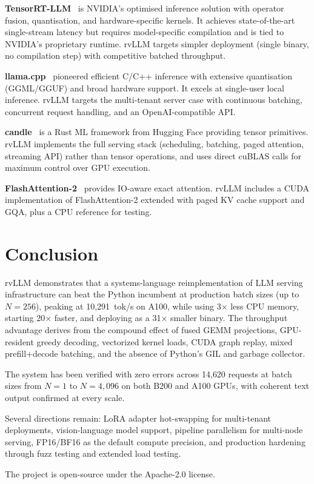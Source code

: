 \documentclass[11pt,a4paper]{article}
\begin{document}
\textbf{TensorRT-LLM}~\cite{tensorrtllm2024} is NVIDIA's optimised inference
solution with operator fusion, quantisation, and hardware-specific kernels. It
achieves state-of-the-art single-stream latency but requires model-specific
compilation and is tied to NVIDIA's proprietary runtime. rvLLM targets simpler
deployment (single binary, no compilation step) with competitive batched throughput.

\textbf{llama.cpp}~\cite{llamacpp2023} pioneered efficient C/C++ inference with
extensive quantisation (GGML/GGUF) and broad hardware support. It excels at
single-user local inference. rvLLM targets the multi-tenant server case with
continuous batching, concurrent request handling, and an OpenAI-compatible API.

\textbf{candle}~\cite{candle2023} is a Rust ML framework from Hugging Face
providing tensor primitives. rvLLM implements the full serving stack
(scheduling, batching, paged attention, streaming API) rather than tensor operations,
and uses direct cuBLAS calls for maximum control over GPU execution.

\textbf{FlashAttention-2}~\cite{dao2023flashattention2} provides IO-aware exact
attention. rvLLM includes a CUDA implementation of FlashAttention-2 extended with
paged KV cache support and GQA, plus a CPU reference for testing.

\section{Conclusion}
\label{sec:conclusion}

rvLLM demonstrates that a systems-language reimplementation of LLM serving
infrastructure can beat the Python incumbent at production batch sizes (up to
$N\!=\!256$), peaking at 10{,}291~tok/s on A100, while using 3$\times$ less CPU
memory, starting 20$\times$ faster, and deploying as a 31$\times$ smaller binary.
The throughput advantage derives from the compound effect of fused GEMM projections,
GPU-resident greedy decoding, vectorized kernel loads, CUDA graph replay,
mixed prefill+decode batching, and the absence of Python's GIL and garbage collector.

The system has been verified with zero errors across 14{,}620 requests at batch
sizes from $N\!=\!1$ to $N\!=\!4{,}096$ on both B200 and A100 GPUs, with coherent
text output confirmed at every scale.

Several directions remain: LoRA adapter hot-swapping for multi-tenant deployments,
vision-language model support, pipeline parallelism for multi-node serving, FP16/BF16
as the default compute precision, and production hardening through fuzz testing and
extended load testing.

The project is open-source under the Apache-2.0 license.



\end{document}
